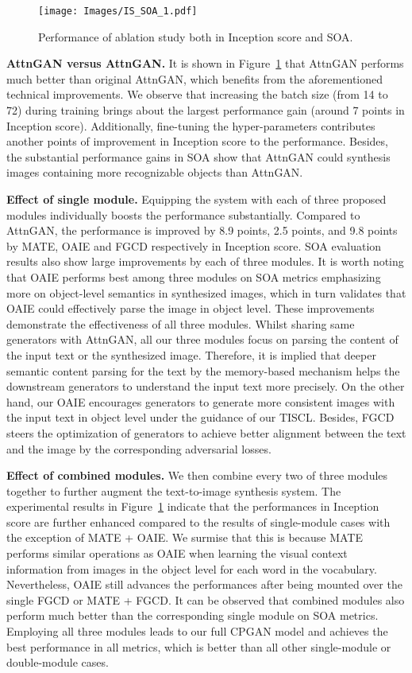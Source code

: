 \documentclass[runningheads]{llncs}
\begin{document}
\begin{figure}[t]
\centering
\texttt{[image: Images/IS\_SOA\_1.pdf]}
\caption{Performance of ablation study both in Inception score and SOA.}
\label{fig:ablation}
\end{figure}
 
 \smallskip\noindent\textbf{AttnGAN versus AttnGAN.} It is shown in Figure~\ref{fig:ablation} that AttnGAN performs much better than original AttnGAN, which benefits from the aforementioned technical improvements. We observe that increasing the batch size (from 14 to 72) during training brings about the largest performance gain (around 7 points in Inception score). Additionally, fine-tuning the hyper-parameters  contributes another  points of improvement in Inception score to the performance. 
 Besides, the substantial performance gains in SOA show that AttnGAN could synthesis images containing more recognizable objects than AttnGAN.
 
 \noindent\textbf{Effect of single module.}
 Equipping the system with each of three proposed modules individually boosts the performance substantially. Compared to AttnGAN, the performance is improved by 8.9 points, 2.5 points, and 9.8 points by MATE, OAIE and FGCD respectively in Inception score. SOA evaluation results also show large improvements by each of three modules. It is worth noting that OAIE performs best among three modules on SOA metrics emphasizing more on object-level semantics in synthesized images, which in turn validates that OAIE could effectively parse the image in object level. These improvements demonstrate the effectiveness of all three modules. Whilst sharing same generators with AttnGAN, all our three modules focus on parsing the content of the input text or the synthesized image. Therefore, it is implied that deeper semantic content parsing for the text by the memory-based mechanism helps the downstream generators to understand the input text more precisely. On the other hand, our OAIE encourages generators to generate more consistent images with the input text in object level under the guidance of our TISCL. Besides, FGCD steers the optimization of generators to achieve better alignment between the text and the image by the corresponding adversarial losses. 
 
\noindent\textbf{Effect of combined modules.}
 We then combine every two of three modules together to further augment the text-to-image synthesis system. The experimental results in Figure~\ref{fig:ablation} indicate that the performances in Inception score are further enhanced compared to the results of single-module cases with the exception of MATE + OAIE. We surmise that this is because MATE performs similar operations as OAIE when learning the visual context information from images in the object level for each word in the vocabulary. Nevertheless, OAIE still advances the performances after being mounted over the single FGCD or MATE + FGCD. It can be observed that combined modules also perform much better than the corresponding single module on SOA metrics.
Employing all three modules leads to our full CPGAN model and achieves the best performance in all metrics, which is better than all other single-module or double-module cases. 
\end{document}
